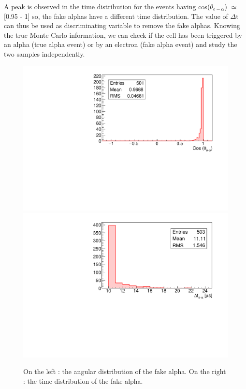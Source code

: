 \documentclass[main.tex]{subfiles}
\begin{document}
\bigskip

\noindent A peak is observed in the time distribution for the events having cos($\theta_{e-\alpha}$) $\simeq$ [0.95 - 1] so, the fake alphas have a different time distribution. The value of $\Delta \text{t}$ can thus be used as discriminating variable to remove the fake alphas. Knowing the true Monte Carlo information, we can check if the cell has been triggered by an alpha (true alpha event) or by an electron (fake alpha event) and study the two samples independently.


\begin{figure}[h!]
\begin{center}
\includegraphics[scale=0.34]{pictures/Chap5/fake_alpha_angle_distribution.pdf}
\includegraphics[scale=0.34]{pictures/Chap5/fake_alpha_time_distribution.pdf}
\caption{On the left : the angular distribution of the fake alpha. On the right : the time distribution of the fake alpha.}
\label{fakeAlphadistribution}
\end{center}
\end{figure}
\end{document}
